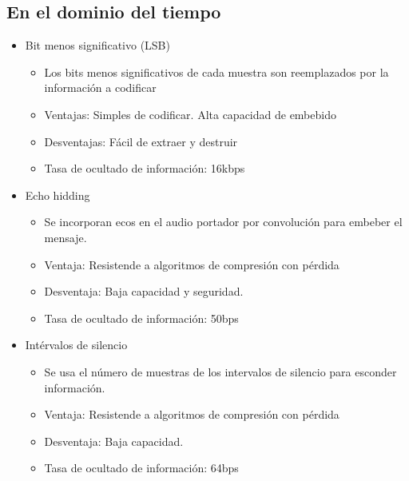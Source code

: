 \documentclass[conference,a4paper,10pt, oneside,final]{tfmpd}
\begin{document}
\subsection{En el dominio del tiempo}
\begin{itemize}
 \item Bit menos significativo (LSB)
 \begin{itemize}
 \item Los bits menos significativos de cada muestra son reemplazados por la información a codificar
 \item Ventajas: Simples de codificar. Alta capacidad de embebido
 \item Desventajas: Fácil de extraer y destruir
 \item Tasa de ocultado de información: 16kbps
 \end{itemize}
 \item Echo hidding
  \begin{itemize}
 \item Se incorporan ecos en el audio portador por convolución para embeber el mensaje.
 \item Ventaja: Resistende a algoritmos de compresión con pérdida
 \item Desventaja: Baja capacidad y seguridad.
 \item Tasa de ocultado de información: 50bps
 \end{itemize}
 \item Intérvalos de silencio
  \begin{itemize}
 \item Se usa el número de muestras de los intervalos de silencio para esconder información.
 \item Ventaja: Resistende a algoritmos de compresión con pérdida
 \item Desventaja: Baja capacidad.
 \item Tasa de ocultado de información: 64bps
 \end{itemize}
\end{itemize}
\end{document}
